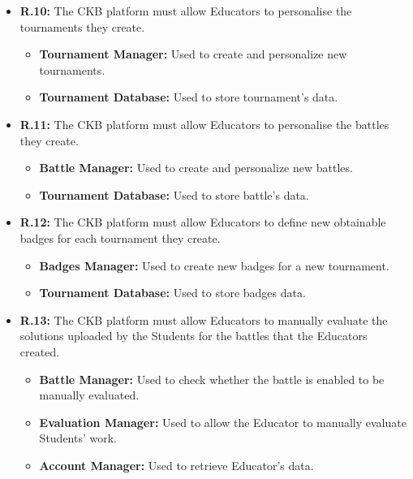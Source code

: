 \documentclass{article}
\begin{document}
{\begin{itemize}
\begin{itemize}
              \item \textbf{Account Manager:} Used to retrieve Educator's data. 
              \item \textbf{Tournament Database:} Used to store the newly created battle's data.
          \end{itemize}
    \item \textbf{R.10:} The CKB platform must allow Educators to personalise the tournaments they create.
          \begin{itemize}
              \item \textbf{Tournament Manager:} Used to create and personalize new tournaments.
              \item \textbf{Tournament Database:} Used to store tournament's data.
          \end{itemize}
    \item \textbf{R.11:} The CKB platform must allow Educators to personalise the battles they create.
          \begin{itemize}
              \item \textbf{Battle Manager:} Used to create and personalize new battles.
              \item \textbf{Tournament Database:} Used to store battle's data.
          \end{itemize}
    \item \textbf{R.12:} The CKB platform must allow Educators to define new obtainable badges for each tournament they
          create.
          \begin{itemize}
              \item \textbf{Badges Manager:} Used to create new badges for a new tournament.
              \item \textbf{Tournament Database:} Used to store badges data.
          \end{itemize}
    \item \textbf{R.13:} The CKB platform must allow Educators to manually evaluate the solutions uploaded by the Students for the battles that
          the Educators created.
          \begin{itemize}
              \item \textbf{Battle Manager:} Used to check whether the battle is enabled to be manually
              evaluated.
              \item \textbf{Evaluation Manager:} Used to allow the Educator to manually evaluate Students'
              work.
              \item \textbf{Account Manager:} Used to retrieve Educator's data.

\end{itemize}
\end{itemize}}
\end{document}
